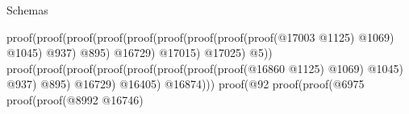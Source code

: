 \begin{lexlean}{Schemas}
\begin{coremodule}
                                                                                                proof(proof(proof(proof(proof(proof(proof(proof(proof(@17003
                                                                                                                    @1125)
                                                                                                                  @1069)
                                                                                                                @1045)
                                                                                                              @937)
                                                                                                            @895)
                                                                                                          @16729)
                                                                                                        @17015)
                                                                                                      @17025)
                                                                                                    @5))
                                                                                              proof(proof(proof(proof(proof(proof(proof(proof(@16860
                                                                                                                @1125)
                                                                                                              @1069)
                                                                                                            @1045)
                                                                                                          @937)
                                                                                                        @895)
                                                                                                      @16729)
                                                                                                    @16405)
                                                                                                  @16874)))
                                                                                        proof(@92
                                                                                            proof(proof(@6975
                                                                                                  proof(proof(@8992
                                                                                                        @16746)

\end{coremodule}
\end{lexlean}
